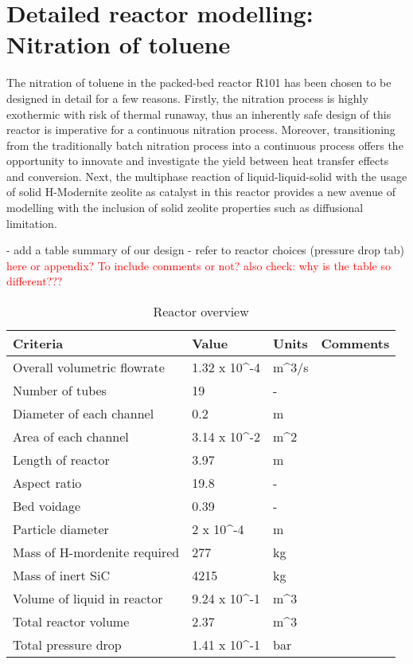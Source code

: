 \section{Detailed reactor modelling: Nitration of toluene}
The nitration of toluene in the packed-bed reactor R101 has been chosen to be designed in detail for a few reasons. Firstly, the nitration process is highly exothermic with risk of thermal runaway, thus an inherently safe design of this reactor is imperative for a continuous nitration process. Moreover, transitioning from the traditionally batch nitration process into a continuous process offers the opportunity to innovate and investigate the yield between heat transfer effects and conversion. Next, the multiphase reaction of liquid-liquid-solid with the usage of solid H-Modernite zeolite as catalyst in this reactor provides a new avenue of modelling with the inclusion of solid zeolite properties such as diffusional limitation. 

- add a table summary of our design - refer to reactor choices (pressure drop tab) \textcolor{red}{here or appendix? To include comments or not?}
\textcolor{red}{also check: why is the table so different???}
\begin{table}[H]
\centering
\caption{Reactor overview}
\label{tab:reactoroverview}
\begin{tabular}{@{}llll@{}}
\toprule
Criteria                     & Value        & Units & Comments \\ \midrule
Overall volumetric flowrate  & 1.32 x 10^-4 & m^3/s &          \\
Number of tubes              & 19           & -     &          \\
Diameter of each channel     & 0.2          & m     &          \\
Area of each channel         & 3.14 x 10^-2 & m^2   &          \\
Length of reactor            & 3.97         & m     &          \\
Aspect ratio                 & 19.8         & -     &          \\
Bed voidage                  & 0.39         & -     &          \\
Particle diameter            & 2 x 10^-4    & m     &          \\
Mass of H-mordenite required & 277          & kg    &          \\
Mass of inert SiC            & 4215         & kg    &          \\
Volume of liquid in reactor  & 9.24 x 10^-1 & m^3   &          \\
Total reactor volume         & 2.37         & m^3   &          \\
Total pressure drop          & 1.41 x 10^-1 & bar   &          \\ \bottomrule
\end{tabular}
\end{table}

